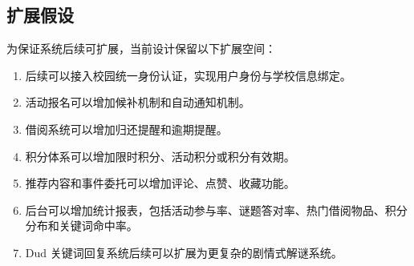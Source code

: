 \documentclass[a4paper,12pt]{article}
\begin{document}
\subsection{扩展假设}

为保证系统后续可扩展，当前设计保留以下扩展空间：

\begin{enumerate}
    \item 后续可以接入校园统一身份认证，实现用户身份与学校信息绑定。
    \item 活动报名可以增加候补机制和自动通知机制。
    \item 借阅系统可以增加归还提醒和逾期提醒。
    \item 积分体系可以增加限时积分、活动积分或积分有效期。
    \item 推荐内容和事件委托可以增加评论、点赞、收藏功能。
    \item 后台可以增加统计报表，包括活动参与率、谜题答对率、热门借阅物品、积分分布和关键词命中率。
    \item Dud 关键词回复系统后续可以扩展为更复杂的剧情式解谜系统。
\end{enumerate}
\end{document}
